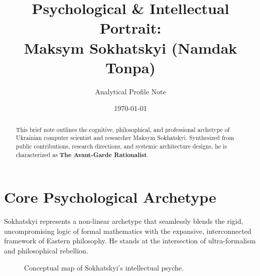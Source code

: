 \documentclass[11pt,a4paper]{article}
\title{\textbf{Psychological \& Intellectual Portrait:\\Maksym Sokhatskyi (Namdak Tonpa)}}
\author{Analytical Profile Note}
\date{\today}
\begin{document}
\maketitle

\begin{abstract}
This brief note outlines the cognitive, philosophical, and professional archetype of Ukrainian computer scientist and researcher Maksym Sokhatskyi. Synthesized from public contributions, research directions, and systemic architecture designs, he is characterized as \textbf{The Avant-Garde Rationalist}.
\end{abstract}

\section{Core Psychological Archetype}
Sokhatskyi represents a non-linear archetype that seamlessly blends the rigid, uncompromising logic of formal mathematics with the expansive, interconnected framework of Eastern philosophy. He stands at the intersection of ultra-formalism and philosophical rebellion.

\begin{figure}[h!]
\centering
{}
\caption{Conceptual map of Sokhatskyi's intellectual psyche.}
\end{figure}
\end{document}
